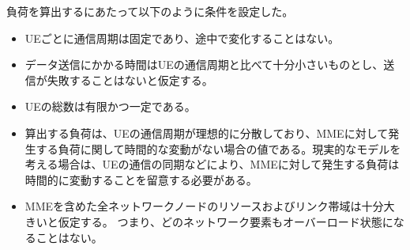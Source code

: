 \documentclass[a4j]{ujarticle}
\begin{document}
負荷を算出するにあたって以下のように条件を設定した。
\begin{itemize}
  \item UEごとに通信周期は固定であり、途中で変化することはない。
  \item データ送信にかかる時間はUEの通信周期と比べて十分小さいものとし、送信が失敗することはないと仮定する。
  \item UEの総数は有限かつ一定である。
  \item 算出する負荷は、UEの通信周期が理想的に分散しており、MMEに対して発生する負荷に関して時間的な変動がない場合の値である。現実的なモデルを考える場合は、UEの通信の同期などにより、MMEに対して発生する負荷は時間的に変動することを留意する必要がある。
  \item MMEを含めた全ネットワークノードのリソースおよびリンク帯域は十分大きいと仮定する。
  つまり、どのネットワーク要素もオーバーロード状態になることはない。
\end{itemize}
\end{document}
